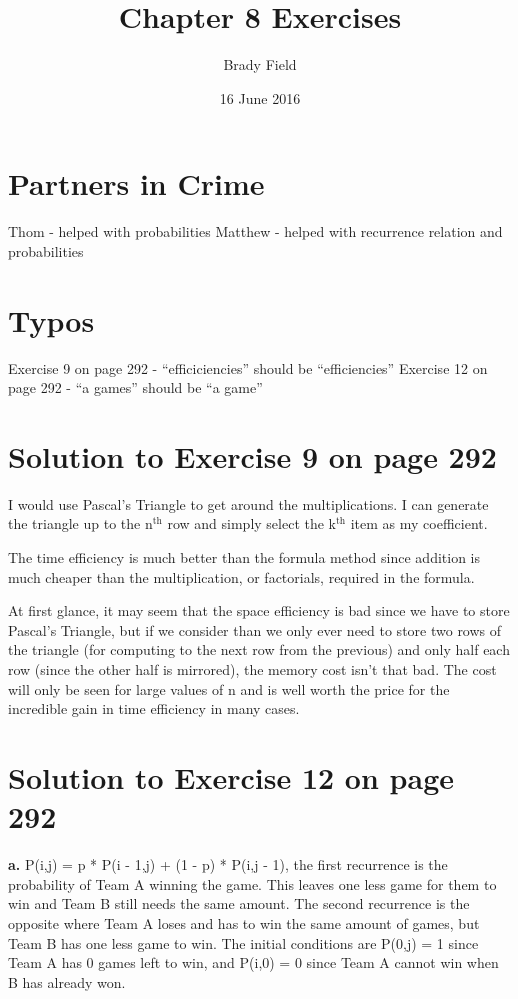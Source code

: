 \documentclass[11pt]{article}
\title{Chapter 8 Exercises}
\author{Brady Field}
\date{16 June 2016}
\begin{document}
\maketitle


\section*{Partners in Crime}
\label{sec-1}

Thom - helped with probabilities
Matthew - helped with recurrence relation and probabilities
\section*{Typos}
\label{sec-2}

Exercise 9 on page 292 - ``efficiciencies'' should be ``efficiencies''
Exercise 12 on page 292 - ``a games'' should be ``a game''
\section*{Solution to Exercise 9 on page 292}
\label{sec-3}


I would use Pascal's Triangle to get around the multiplications. I can
generate the triangle up to the n$^{\mathrm{th}}$ row and simply select the k$^{\mathrm{th}}$
item as my coefficient.

The time efficiency is much better than the formula method since
addition is much cheaper than the multiplication, or factorials,
required in the formula.

At first glance, it may seem that the space efficiency is bad since we
have to store Pascal's Triangle, but if we consider than we only ever
need to store two rows of the triangle (for computing to the next row
from the previous) and only half each row (since the other half is
mirrored), the memory cost isn't that bad. The cost will only be seen for
large values of n and is well worth the price for the incredible gain
in time efficiency in many cases.
\section*{Solution to Exercise 12 on page 292}
\label{sec-4}


\textbf{a.} P(i,j) = p * P(i - 1,j) + (1 - p) * P(i,j - 1), the first
recurrence is the probability of Team A winning the game. This leaves
one less game for them to win and Team B still needs the same
amount. The second recurrence is the opposite where Team A loses and
has to win the same amount of games, but Team B has one less game to
win. The initial conditions are P(0,j) = 1 since Team A has 0 games
left to win, and P(i,0) = 0 since Team A cannot win when B has already
won.
\end{document}
